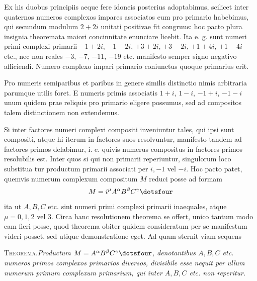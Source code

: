 Ex his duobus principiis aeque fere idoneis posterius adoptabimus, scilicet inter quaternos numeros complexos impares associatos eum pro primario habebimus, qui secundum modulum $2+2i$ unitati positivae fit congruus: hoc pacto plura insignia theoremata maiori concinnitate enunciare licebit. Ita e. g. sunt numeri primi complexi primarii $-1+2i$, $-1-2i$, $+3+2i$, $+3-2i$, $+1+4i$, $+1-4i$ etc., nec non reales $-3$, $-7$, $-11$, $-19$ etc. manifesto semper signo negativo afficiendi. Numero complexo impari primario coniunctus quoque primarius erit.

Pro numeris semiparibus et paribus in genere similis distinctio nimis arbitraria parumque utilis foret. E numeris primis associatis $1+i$, $1-i$, $-1+i$, $-1-i$ unum quidem prae reliquis pro primario eligere possumus, sed ad compositos talem distinctionem non extendemus.

Si inter factores numeri complexi compositi inveniuntur tales, qui ipsi sunt compositi, atque hi iterum in factores suos resolvuntur, manifesto tandem ad factores primos delabimur, i. e. quivis numerus compositus in factores primos resolubilis est. Inter quos si qui non primarii reperiuntur, singulorum loco substitua%
%
tur productum primarii associati per $i,-1$ vel $-i$. Hoc pacto patet, quemvis numerum complexum compositum $M$ reduci posse ad formam
\[
M=i^\mu A^\alpha B^\beta C^\gamma\dotsfour
\]
ita ut $A,B,C$ etc. sint numeri primi complexi primarii inaequales, atque $\mu=0,1,2$ vel $3$. Circa hanc resolutionem theorema se offert, unico tantum modo eam fieri posse, quod theorema obiter quidem consideratum per se manifestum videri posset, sed utique demonstratione eget. Ad quam sternit viam sequens

\textsc{Theorema.}\quad\emph{Productum $M=A^\alpha B^\beta C^\gamma\dotsfour$, denotantibus $A,B,C$ etc. numeros primos complexos primarios diversos, divisibile esse nequit per ullum numerum primum complexum primarium, qui inter $A,B,C$ etc. non reperitur.}


